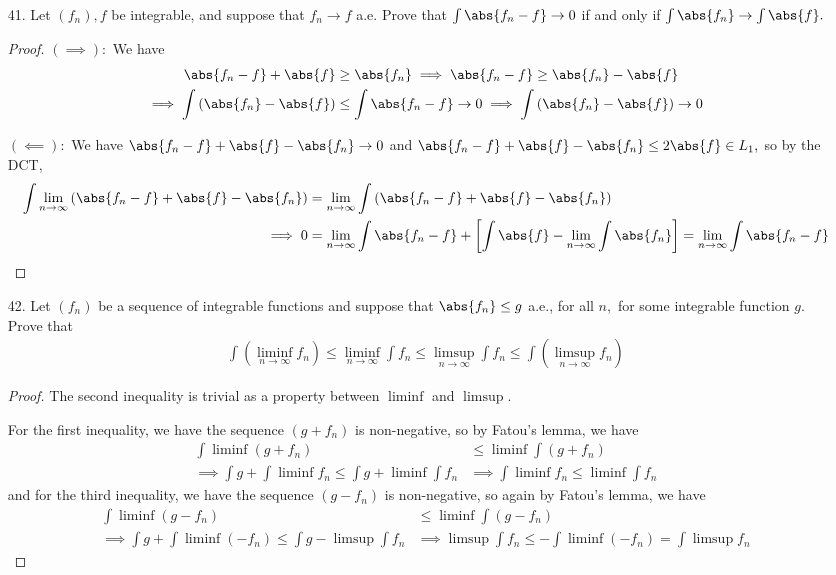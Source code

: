 \documentclass{article}
\begin{document}
\begin{itemize}
	\item[41.] Let $(f_n), f$ be integrable, and suppose that $f_n\to f$ a.e. Prove that $\int\abs{f_n-f}\to 0$ if and only if $\int \abs{f_n}\to\int \abs{f}.$
		\begin{proof}
			$(\implies):$ We have
			\begin{align*}
				\abs{f_n-f}+\abs{f} &\ge \abs{f_n}\implies \abs{f_n-f}\ge \abs{f_n}-\abs{f} \\
				\implies \int \left( \abs{f_n}-\abs{f} \right) &\le \int \abs{f_n-f}\to 0 \implies \int \left( \abs{f_n}-\abs{f} \right) \to 0
			\end{align*}

			$(\impliedby):$ We have $\abs{f_n-f}+\abs{f}-\abs{f_n}\to 0$ and $\abs{f_n-f}+\abs{f}-\abs{f_n}\le 2\abs{f}\in L_1,$ so by the DCT,
			\begin{align*}
				\int\lim_{n\to\infty} \left( \abs{f_n-f}+\abs{f}-\abs{f_n} \right) &= \lim_{n\to\infty} \int \left( \abs{f_n-f}+\abs{f}-\abs{f_n} \right) \\
				\implies 0 &= \lim_{n\to\infty}\int\abs{f_n-f} + \left[ \int\abs{f}-\lim_{n\to\infty}\int \abs{f_n} \right] = \lim_{n\to\infty} \int\abs{f_n-f}
			\end{align*}
		\end{proof}

	\item[42.] Let $(f_n)$ be a sequence of integrable functions and suppose that $\abs{f_n}\le g$ a.e., for all $n,$ for some integrable function $g.$ Prove that
		\begin{align*}
			\int\left( \liminf_{n\to\infty} f_n \right)\le\liminf_{n\to\infty} \int f_n\le \limsup_{n\to\infty}\int f_n\le \int\left( \limsup_{n\to\infty} f_n \right)
		\end{align*}
		\begin{proof}
			The second inequality is trivial as a property between $\liminf$ and $\limsup.$		

			For the first inequality, we have the sequence $(g+f_n)$ is non-negative, so by Fatou's lemma, we have
			\begin{align*}
				\int \liminf(g+f_n) &\le \liminf \int (g+f_n) \\
				\implies \int g + \int\liminf f_n \le \int g + \liminf \int f_n &\implies \int\liminf f_n \le \liminf \int f_n
			\end{align*}
			and for the third inequality, we have the sequence $(g-f_n)$ is non-negative, so again by Fatou's lemma, we have
			\begin{align*}
				\int \liminf (g-f_n) &\le \liminf \int (g-f_n) \\
				\implies \int g + \int\liminf (-f_n) \le \int g - \limsup \int f_n &\implies \limsup \int f_n \le -\int \liminf(-f_n) = \int \limsup f_n
			\end{align*}
		\end{proof}


\end{itemize}
\end{document}
